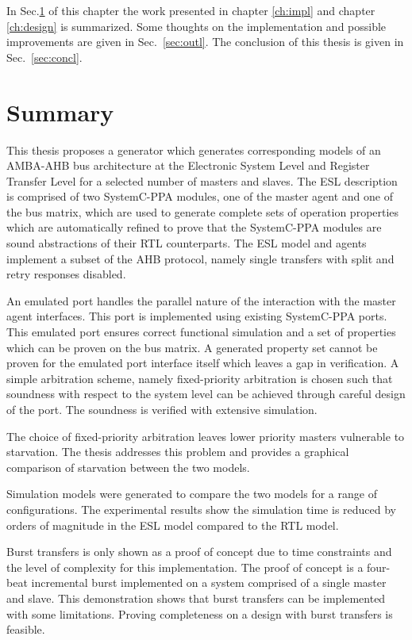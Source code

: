 In Sec.\ref{sec:sum} of this chapter the work presented in chapter \ref{ch:impl} and chapter \ref{ch:design} is summarized. Some thoughts on the implementation and possible improvements are given in Sec.~\ref{sec:outl}. The conclusion of this thesis is given in Sec.~\ref{sec:concl}.

\section{Summary}
\label{sec:sum}
This thesis proposes a generator which generates corresponding models of an AMBA-AHB bus architecture at the Electronic System Level and Register Transfer Level for a selected number of masters and slaves. The ESL description is comprised of two SystemC-PPA modules, one of the master agent and one of the bus matrix, which are used to generate complete sets of operation properties which are automatically refined to prove that the SystemC-PPA modules are sound abstractions of their RTL counterparts. The ESL model and agents implement a subset of the AHB protocol, namely single transfers with split and retry responses disabled. \par
An emulated port handles the parallel nature of the interaction with the master agent interfaces. This port is implemented using existing SystemC-PPA ports. This emulated port ensures correct functional simulation and a set of properties which can be proven on the bus matrix. A generated property set cannot be proven for the emulated port interface itself which leaves a gap in verification. A simple arbitration scheme, namely fixed-priority arbitration is chosen such that soundness with respect to the system level can be achieved through careful design of the port. The soundness is verified with extensive simulation. \par
The choice of fixed-priority arbitration leaves lower priority masters vulnerable to starvation. The thesis addresses this problem and provides a graphical comparison of starvation between the two models. \par
Simulation models were generated to compare the two models for a range of configurations. The experimental results show the simulation time is reduced by orders of magnitude in the ESL model compared to the RTL model. \par 
Burst transfers is only shown as a proof of concept due to time constraints and the level of complexity for this implementation. The proof of concept is a four-beat incremental burst implemented on a system comprised of a single master and slave. This demonstration shows that burst transfers can be implemented with some limitations. Proving completeness on a design with burst transfers is feasible. \par
 


